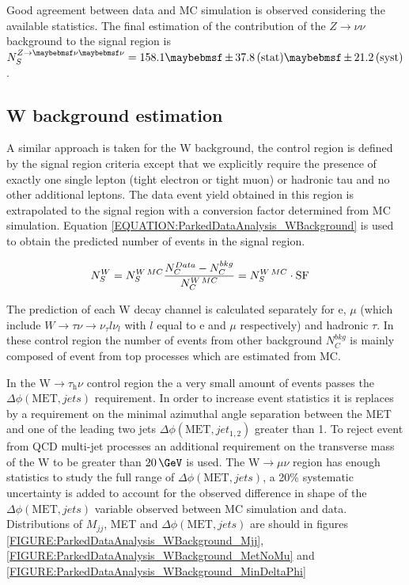 Good agreement between data and \gls{MC} simulation is observed considering the available statistics. The final estimation of the contribution of the $Z\rightarrow \nu\nu$ background to the signal region is $N_{S}^{Z\rightarrow\nu\nu}= 158.1 \pm 37.8 \stat \pm 21.2 \syst$.

\subsection{W background estimation}
\label{SECTION:ParkedDataAnalysis_ControlRegions_WBackground}


A similar approach is taken for the W background, the control region is defined by the signal region criteria except that we explicitly require the presence of exactly one single lepton (tight electron or tight muon) or hadronic tau and no other additional leptons. The data event yield obtained in this region is extrapolated to the signal region with a conversion factor determined from \gls{MC} simulation. Equation \ref{EQUATION:ParkedDataAnalysis_WBackground} is used to obtain the predicted number of events in the signal region.

\begin{align}
N_{S}^{W}&=N_{S}^{W\,MC}\frac{N_{C}^{Data}-N_{C}^{bkg}}{N_{C}^{W\,MC}}=N_{S}^{W\,MC}\cdot \rm{SF}
\label{EQUATION:ParkedDataAnalysis_WBackground}
\end{align}

The prediction of each W decay channel is calculated separately for e, $\mu$ (which include $W\rightarrow\tau\nu\rightarrow \nu_\tau l\nu_l$ with $l$ equal to e and $\mu$ respectively) and hadronic $\tau$. In these control region the number of events from other background $N_{C}^{bkg}$ is mainly composed of event from top processes which are estimated from \gls{MC}.

In the W$\rightarrow\tau_{\mathrm{h}}\nu$ control region the a very small amount of events passes the $\Delta\phi(\text{MET},jets)$ requirement. In order to increase event statistics it is replaces by a requirement on the minimal azimuthal angle separation between the \gls{MET} and one of the leading two jets $\Delta\phi(\text{MET},jet_{1,2})$ greater than 1. To reject event from \gls{QCD} multi-jet processes an additional requirement on the transverse mass of the W to be greater than $20\,\GeV$ is used. The W$\rightarrow\mu\nu$ region has enough statistics to study the full range of $\Delta\phi(\text{MET},jets)$, a 20\% systematic uncertainty is added to account for the observed difference in shape of the $\Delta\phi(\text{MET},jets)$ variable observed between \gls{MC} simulation and data. Distributions of $M_{jj}$, \gls{MET} and $\Delta\phi(\text{MET},jets)$ are should in figures \ref{FIGURE:ParkedDataAnalysis_WBackground_Mjj}, \ref{FIGURE:ParkedDataAnalysis_WBackground_MetNoMu} and \ref{FIGURE:ParkedDataAnalysis_WBackground_MinDeltaPhi}

